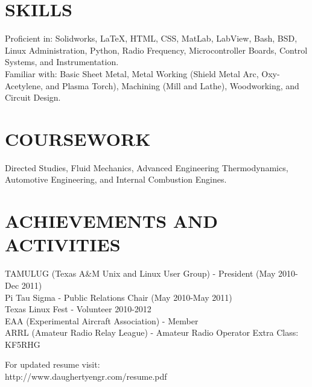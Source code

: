 \documentclass{res}
\begin{document}
\begin{resume}
\section{SKILLS}          
	Proficient in: Solidworks, \LaTeX{}, HTML, CSS, MatLab, LabView, Bash, BSD, Linux Administration, Python, Radio Frequency, Microcontroller Boards, Control Systems, and Instrumentation.\\
    Familiar with: Basic Sheet Metal, Metal Working (Shield Metal Arc, Oxy-Acetylene, and Plasma Torch), Machining (Mill and Lathe), Woodworking, and Circuit Design.

\section{COURSEWORK}
	Directed Studies, Fluid Mechanics, Advanced Engineering Thermodynamics, Automotive Engineering, and Internal Combustion Engines.


\section{ACHIEVEMENTS AND ACTIVITIES}
	TAMULUG (Texas A\&M Unix and Linux User Group) - President (May 2010-Dec 2011)\\
	Pi Tau Sigma - Public Relations Chair (May 2010-May 2011)\\
	Texas Linux Fest - Volunteer 2010-2012\\
    EAA (Experimental Aircraft Association) - Member\\
    ARRL (Amateur Radio Relay League) - Amateur Radio Operator Extra Class: KF5RHG 

    \begin{center}
        For updated resume visit:\\
        http://www.daughertyengr.com/resume.pdf
    \end{center}
\end{resume}
\end{document}
